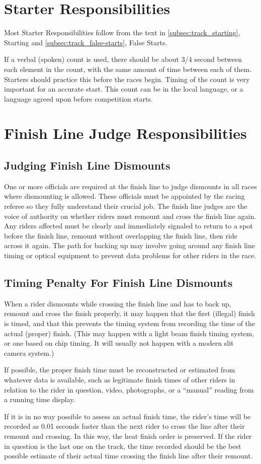 \section{Starter Responsibilities\label{sec:track_starter}}

Most Starter Responsibilities follow from the text in \ref{subsec:track_starting}, Starting and \ref{subsec:track_false-starts}, False Starts.

If a verbal (spoken) count is used, there should be about 3/4 second between each element in the count, with the same amount of time between each of them.
Starters should practice this before the races begin.
Timing of the count is very important for an accurate start.
This count can be in the local language, or a language agreed upon before competition starts.

\section{Finish Line Judge Responsibilities}

\subsection{Judging Finish Line Dismounts}
One or more officials are required at the finish line to judge dismounts in all races where dismounting is allowed.
These officials must be appointed by the racing referee so they fully understand their crucial job.
The finish line judges are the voice of authority on whether riders must remount and cross the finish line again.
Any riders affected must be clearly and immediately signaled to return to a spot before the finish line, remount without overlapping the finish line, then ride across it again.
The path for backing up may involve going around any finish line timing or optical equipment to prevent data problems for other riders in the race.

\subsection{Timing Penalty For Finish Line Dismounts}
When a rider dismounts while crossing the finish line and has to back up, remount and cross the finish properly, it may happen that the first (illegal) finish is timed, and that this prevents the timing system from recording the time of the actual (proper) finish.
(This may happen with a light beam finish timing system, or one based on chip timing.
It will usually not happen with a modern slit camera system.)

If possible, the proper finish time must be reconstructed or estimated from whatever data is available, such as legitimate finish times of other riders in relation to the rider in question, video, photographs, or a ``manual'' reading from a running time display.

If it is in no way possible to assess an actual finish time, the rider’s time will be recorded as 0.01 seconds faster than the next rider to cross the line after their remount and crossing.
In this way, the heat finish order is preserved.
If the rider in question is the last one on the track, the time recorded should be the best possible estimate of their actual time crossing the finish line after their remount.
